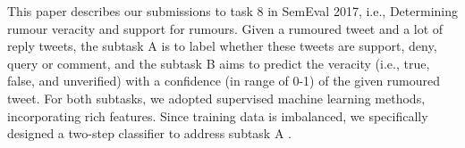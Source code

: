 This paper describes our submissions to task 8 in SemEval 2017, i.e., Determining rumour veracity and support for rumours. Given a rumoured tweet and a lot of reply tweets, the subtask A is to label whether these tweets are support, deny, query or comment, and the subtask B aims to predict the veracity (i.e., true, false, and unverified) with a confidence (in range of 0-1) of the given rumoured tweet. For both subtasks, we adopted supervised machine learning methods, incorporating rich features. Since training data is imbalanced, we specifically designed a two-step classifier to address subtask A .
